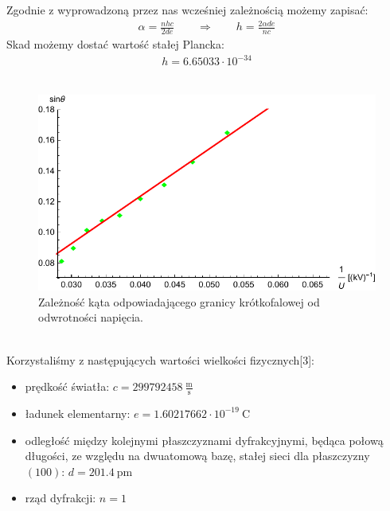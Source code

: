 \documentclass[paper=a4, fontsize=12pt]{scrartcl}
\begin{document}
Zgodnie z wyprowadzoną przez nas wcześniej zależnością możemy zapisać:
\begin{align*}
\alpha=\frac{nhc}{2de}\qquad\Rightarrow\qquad h=\frac{2\alpha d e}{nc}
\end{align*}
Skad możemy dostać wartość stałej Plancka:
\begin{align*}
h=6.65033\cdot10^{-34}
\end{align*}\\\begin{figure}[h!]
	\centering
	\includegraphics[width=0.9\linewidth]{fitsin}
	\caption{Zależność kąta odpowiadającego granicy krótkofalowej od odwrotności napięcia.}
	\label{fig:fitsin}
\end{figure}\\
Korzystaliśmy z następujących wartości wielkości fizycznych[3]:
\begin{itemize}
	\item prędkość światła: $c=299792458\:\mathrm{\frac{m}{s}}$
	\item ładunek elementarny: $e=1.60217662\cdot 10^{-19}\:\mathrm{C}$
	\item odległość między kolejnymi płaszczyznami dyfrakcyjnymi, będąca połową długości, ze względu na dwuatomową bazę, stałej sieci dla płaszczyzny $(100)$: $d=201.4\:\mathrm{pm}$
	\item rząd dyfrakcji: $n=1$
\end{itemize}
\newpage
\end{document}
